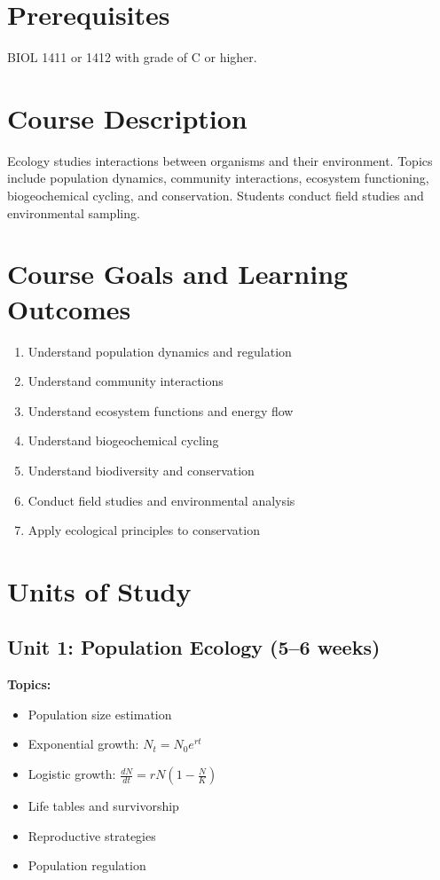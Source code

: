 \documentclass[12pt,oneside]{book}
\begin{document}
\section{Prerequisites}

BIOL 1411 or 1412 with grade of C or higher.

\section{Course Description}

Ecology studies interactions between organisms and their environment. Topics include population dynamics, community interactions, ecosystem functioning, biogeochemical cycling, and conservation. Students conduct field studies and environmental sampling.

\section{Course Goals and Learning Outcomes}

\begin{enumerate}
    \item Understand population dynamics and regulation
    \item Understand community interactions
    \item Understand ecosystem functions and energy flow
    \item Understand biogeochemical cycling
    \item Understand biodiversity and conservation
    \item Conduct field studies and environmental analysis
    \item Apply ecological principles to conservation
\end{enumerate}

\section{Units of Study}

\subsection{Unit 1: Population Ecology (5--6 weeks)}

\textbf{Topics:}
\begin{itemize}
    \item Population size estimation
    \item Exponential growth: $N_t = N_0 e^{rt}$
    \item Logistic growth: $\frac{dN}{dt} = rN\left(1 - \frac{N}{K}\right)$
    \item Life tables and survivorship
    \item Reproductive strategies
    \item Population regulation
\end{itemize}
\end{document}
